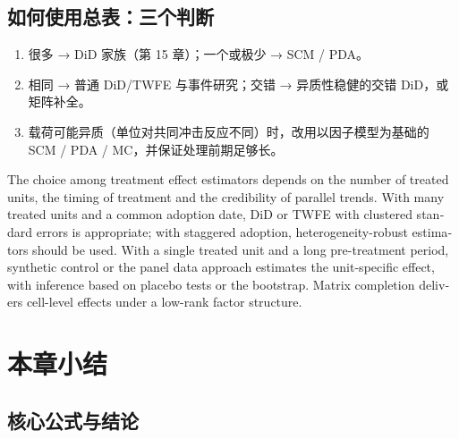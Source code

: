 \subsection{如何使用总表：三个判断}

\begin{enumerate}
  \item {} 很多 → DiD 家族（第 15 章）；一个或极少 → SCM / PDA。
  \item {} 相同 → 普通 DiD/TWFE 与事件研究；交错 → 异质性稳健的交错 DiD，或矩阵补全。
  \item {} 载荷可能异质（单位对共同冲击反应不同）时，改用以因子模型为基础的 SCM / PDA / MC，并保证处理前期足够长。
\end{enumerate}

\begin{english}
The choice among treatment effect estimators depends on the number of treated units, the timing of treatment and the credibility of parallel trends. With many treated units and a common adoption date, DiD or TWFE with clustered standard errors is appropriate; with staggered adoption, heterogeneity-robust estimators should be used. With a single treated unit and a long pre-treatment period, synthetic control or the panel data approach estimates the unit-specific effect, with inference based on placebo tests or the bootstrap. Matrix completion delivers cell-level effects under a low-rank factor structure.
\end{english}

\section{本章小结}\label{sec:U16-summary}

\subsection{核心公式与结论}


